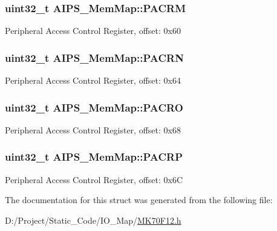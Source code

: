 \subsubsection[{P\+A\+C\+R\+M}]{\setlength{\rightskip}{0pt plus 5cm}uint32\+\_\+t A\+I\+P\+S\+\_\+\+Mem\+Map\+::\+P\+A\+C\+R\+M}\label{struct_a_i_p_s___mem_map_a30e7ebe0ffb0e9d97cbfa85d65e17cbb}
Peripheral Access Control Register, offset\+: 0x60 \hypertarget{struct_a_i_p_s___mem_map_a83bf08b950901b8f6d7ef2ceb960baa8}{}
\subsubsection[{P\+A\+C\+R\+N}]{\setlength{\rightskip}{0pt plus 5cm}uint32\+\_\+t A\+I\+P\+S\+\_\+\+Mem\+Map\+::\+P\+A\+C\+R\+N}\label{struct_a_i_p_s___mem_map_a83bf08b950901b8f6d7ef2ceb960baa8}
Peripheral Access Control Register, offset\+: 0x64 \hypertarget{struct_a_i_p_s___mem_map_a5892f2b025c43f875f1c88e3a8f6da30}{}
\subsubsection[{P\+A\+C\+R\+O}]{\setlength{\rightskip}{0pt plus 5cm}uint32\+\_\+t A\+I\+P\+S\+\_\+\+Mem\+Map\+::\+P\+A\+C\+R\+O}\label{struct_a_i_p_s___mem_map_a5892f2b025c43f875f1c88e3a8f6da30}
Peripheral Access Control Register, offset\+: 0x68 \hypertarget{struct_a_i_p_s___mem_map_af6d96671be0c664042ec003595ac405e}{}
\subsubsection[{P\+A\+C\+R\+P}]{\setlength{\rightskip}{0pt plus 5cm}uint32\+\_\+t A\+I\+P\+S\+\_\+\+Mem\+Map\+::\+P\+A\+C\+R\+P}\label{struct_a_i_p_s___mem_map_af6d96671be0c664042ec003595ac405e}
Peripheral Access Control Register, offset\+: 0x6\+C 

The documentation for this struct was generated from the following file\+:\begin{DoxyCompactItemize}
\item 
D\+:/\+Project/\+Static\+\_\+\+Code/\+I\+O\+\_\+\+Map/\hyperlink{_m_k70_f12_8h}{M\+K70\+F12.\+h}\end{DoxyCompactItemize}
